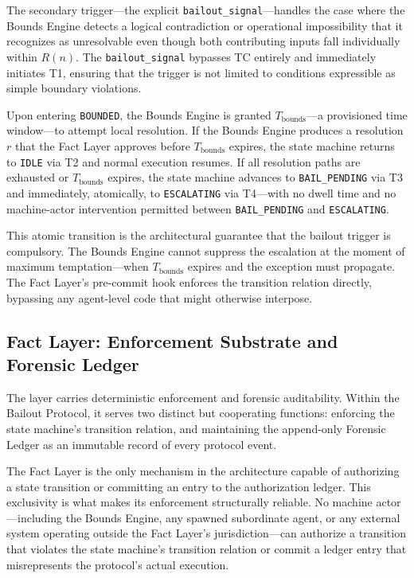 The secondary trigger---the explicit \texttt{bailout\_signal}---handles the case where the Bounds Engine detects a logical contradiction or operational impossibility that it recognizes as unresolvable even though both contributing inputs fall individually within $R(n)$. The \texttt{bailout\_signal} bypasses TC entirely and immediately initiates T1, ensuring that the trigger is not limited to conditions expressible as simple boundary violations.

Upon entering \texttt{BOUNDED}, the Bounds Engine is granted $T_{\text{bounds}}$---a provisioned time window---to attempt local resolution. If the Bounds Engine produces a resolution $r$ that the Fact Layer approves before $T_{\text{bounds}}$ expires, the state machine returns to \texttt{IDLE} via T2 and normal execution resumes. If all resolution paths are exhausted or $T_{\text{bounds}}$ expires, the state machine advances to \texttt{BAIL\_PENDING} via T3 and immediately, atomically, to \texttt{ESCALATING} via T4---with no dwell time and no machine-actor intervention permitted between \texttt{BAIL\_PENDING} and \texttt{ESCALATING}.

This atomic transition is the architectural guarantee that the bailout trigger is compulsory. The Bounds Engine cannot suppress the escalation at the moment of maximum temptation---when $T_{\text{bounds}}$ expires and the exception must propagate. The Fact Layer's pre-commit hook enforces the transition relation directly, bypassing any agent-level code that might otherwise interpose.

\subsection{Fact Layer: Enforcement Substrate and Forensic Ledger}\label{sec:fact-layer}

The \fact{} layer carries deterministic enforcement and forensic auditability. Within the Bailout Protocol, it serves two distinct but cooperating functions: enforcing the state machine's transition relation, and maintaining the append-only Forensic Ledger as an immutable record of every protocol event.

The Fact Layer is the only mechanism in the \bxthree{} architecture capable of authorizing a state transition or committing an entry to the authorization ledger. This exclusivity is what makes its enforcement structurally reliable. No machine actor---including the Bounds Engine, any spawned subordinate agent, or any external system operating outside the Fact Layer's jurisdiction---can authorize a transition that violates the state machine's transition relation or commit a ledger entry that misrepresents the protocol's actual execution.

